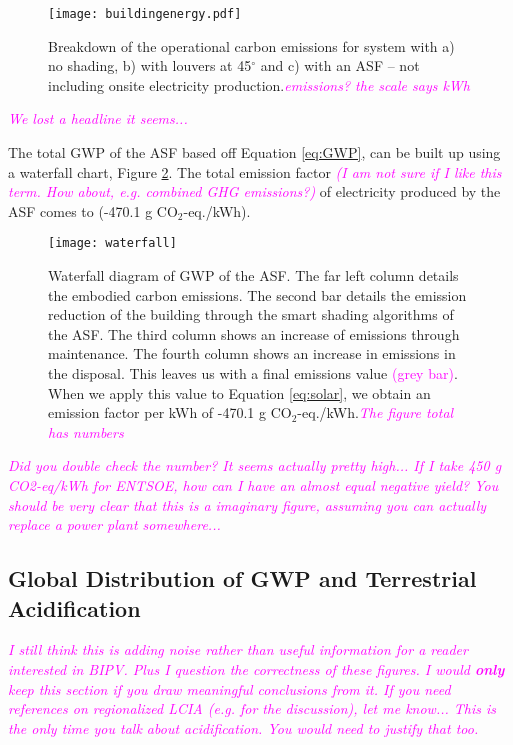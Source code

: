\begin{figure}[H]
\begin{center}
\texttt{[image: buildingenergy.pdf]}
\caption{Breakdown of the operational carbon emissions for system with a) no shading, b) with louvers at 45$^\circ$ and c) with an ASF -- not including onsite electricity production.\textcolor{magenta}{\textit{emissions? the scale says kWh}}}
\label{fig:operational}
\end{center}
\end{figure}

\textcolor{magenta}{\textit{We lost a headline it seems...}}

The total GWP of the ASF based off Equation \ref{eq:GWP}, can be built up using a waterfall chart, Figure \ref{fig:waterfall}. The total emission factor \textcolor{magenta}{\textit{(I am not sure if I like this term. How about, e.g. combined GHG emissions?)}} of electricity produced by the ASF comes to (-470.1 g CO$_2$-eq./kWh).\\

\begin{figure}[H]
\begin{center}
\texttt{[image: waterfall]}
\caption{Waterfall diagram of GWP of the ASF. The far left column details the embodied carbon emissions. The second bar details the emission reduction of the building through the smart shading algorithms of the ASF. The third column shows an increase of emissions through maintenance. The fourth column shows an increase in emissions in the disposal. This leaves us with a final emissions value \textcolor{magenta}{(grey bar)}. When we apply this value to Equation \ref{eq:solar}, we obtain an emission factor per kWh of -470.1 g CO$_2$-eq./kWh.\textcolor{magenta}{\textit{The figure total has numbers}}}
\label{fig:waterfall}
\end{center}
\end{figure}

\textcolor{magenta}{\textit{Did you double check the number? It seems actually pretty high... If I take 450 g CO2-eq/kWh for ENTSOE, how can I have an almost equal negative yield? You should be very clear that this is a imaginary figure, assuming you can actually replace a power plant somewhere...}}

\subsection{Global Distribution of GWP and Terrestrial Acidification}
\textcolor{magenta}{\textit{I still think this is adding noise rather than useful information for a reader interested in BIPV. Plus I question the correctness of these figures. I would \textbf{only} keep this section if you draw meaningful conclusions from it. If you need references on regionalized LCIA (e.g. for the discussion), let me know... This is the only time you talk about acidification. You would need to justify that too.}}

